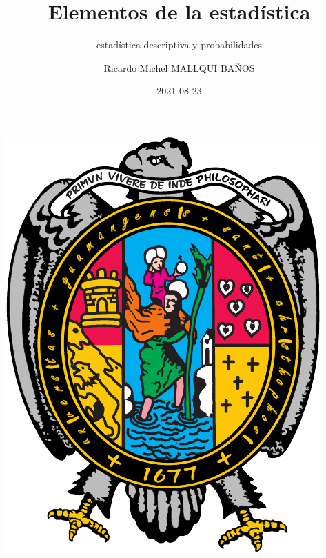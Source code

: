 \documentclass[10pt,]{krantz}
\title{Elementos de la estadística}
\subtitle{estadística descriptiva y probabilidades}
\author{Ricardo Michel MALLQUI BAÑOS}
\date{2021-08-23}
\let\oldincludegraphics\includegraphics
\renewcommand\includegraphics[2][]{%
  \oldincludegraphics[scale=0.85]{#2}
}
\theoremstyle{definition}
\theoremstyle{definition}
\theoremstyle{definition}
\theoremstyle{definition}
\theoremstyle{remark}
\begin{document}
\maketitle

\thispagestyle{empty}
\begin{center}
\includegraphics{U.pdf}
\end{center}


{
\hypersetup{linkcolor=}
\setcounter{tocdepth}{2}
\tableofcontents
}
\listoftables
\listoffigures
\newcommand{\N}{\mathbb{N}}
\newcommand{\R}{\mathbb{R}}
\newcommand{\CC}{\mathbb{C}}
\newcommand{\I}{\mathbb{I}}
\newcommand{\f}{\mathbb{f}}
\newcommand{\X}{\mathbb{X}}
\newcommand{\D}{\mathbb{D}}
\newcommand{\Z}{\mathbb{Z}}
\newcommand{\Q}{\mathbb{Q}}
\newcommand{\norm}[1]{\left\Vert#1\right\Vert}
\newcommand{\abs}[1]{\left\vert#1\right\vert}
\newcommand{\set}[1]{\left\{#1\right\}}
\newcommand{\seq}[1]{\left<#1\right>}
\newcommand{\co}[1]{\left[#1\right]}
\newcommand{\cc}[1]{\left(#1\right)}
\newcommand{\J}{\mathcal{J}}
\newcommand{\K}{\mathcal{K}}
\newcommand{\M}{\mathcal{M}}
\newcommand{\F}{\mathcal{F}}
\end{document}
